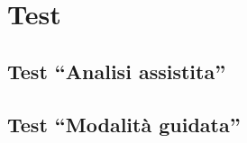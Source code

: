 \chapter{Test}
\label{chap:test}

\section{Test ``Analisi assistita''}


\section{Test ``Modalità guidata''}